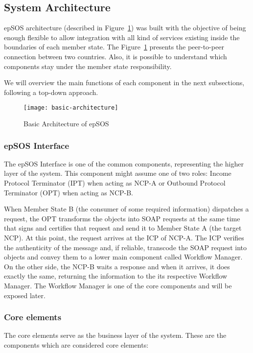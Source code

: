 \subsection{System Architecture}

epSOS architecture (described in Figure~\ref{fig:epsos-architecture}) was built with the objective of being enough flexible to allow integration with all kind of services existing inside the boundaries of each member state. The Figure~\ref{fig:epsos-architecture} presents the peer-to-peer connection between two countries. Also, it is possible to understand which components stay under the member state responsibility.

We will overview the main functions of each component in the next subsections, following a top-down approach.

\begin{figure}[t]
\texttt{[image: basic-architecture]}
\caption[Basic Architecture of epSOS]{Basic Architecture of epSOS~\citep{EpSOS}}
\label{fig:epsos-architecture}
\end{figure}

\subsubsection{epSOS Interface}
The epSOS Interface is one of the common components, representing the higher layer of the system. This component might assume one of two roles: Income Protocol Terminator (IPT) when acting as NCP-A or Outbound Protocol Terminator (OPT) when acting as NCP-B.

When Member State B (the consumer of some required information) dispatches a request, the OPT transforms the objects into SOAP requests at the same time that signs and certifies that request and send it to Member State A (the target NCP). At this point, the request arrives at the ICP of NCP-A. The ICP verifies the authenticity of the message and, if reliable, transcode the SOAP request into objects and convey them to a lower main component called Workflow Manager. On the other side, the NCP-B waits a response and when it arrives, it does exactly the same, returning the information to the its respective Workflow Manager. The Workflow Manager is one of the core components and will be exposed later.

\subsubsection{Core elements}
The core elements serve as the business layer of the system. These are the components which are considered core elements:

